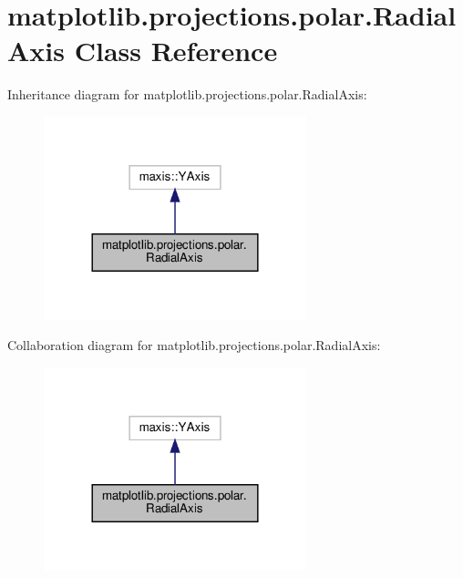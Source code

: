 \hypertarget{classmatplotlib_1_1projections_1_1polar_1_1RadialAxis}{}\section{matplotlib.\+projections.\+polar.\+Radial\+Axis Class Reference}
\label{classmatplotlib_1_1projections_1_1polar_1_1RadialAxis}


Inheritance diagram for matplotlib.\+projections.\+polar.\+Radial\+Axis\+:
\nopagebreak
\begin{figure}[H]
\begin{center}
\leavevmode
\includegraphics[width=216pt]{classmatplotlib_1_1projections_1_1polar_1_1RadialAxis__inherit__graph}
\end{center}
\end{figure}


Collaboration diagram for matplotlib.\+projections.\+polar.\+Radial\+Axis\+:
\nopagebreak
\begin{figure}[H]
\begin{center}
\leavevmode
\includegraphics[width=216pt]{classmatplotlib_1_1projections_1_1polar_1_1RadialAxis__coll__graph}
\end{center}
\end{figure}
